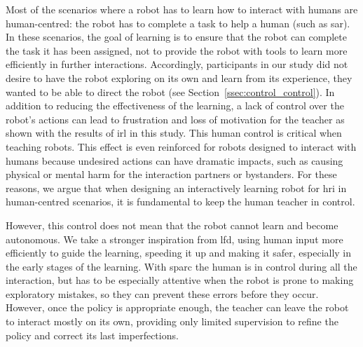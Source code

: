 Most of the scenarios where a robot has to learn how to interact with humans are human-centred: the robot has to complete a task to help a human (such as \gls{sar}). In these scenarios, the goal of learning is to ensure that the robot can complete the task it has been assigned, not to provide the robot with tools to learn more efficiently in further interactions. Accordingly, participants in our study did not desire to have the robot exploring on its own and learn from its experience, they wanted to be able to direct the robot (see Section~\ref{ssec:control_control}). In addition to reducing the effectiveness of the learning, a lack of control over the robot's actions can lead to frustration and loss of motivation for the teacher as shown with the results of \gls{irl} in this study. This human control is critical when teaching robots. This effect is even reinforced for robots designed to interact with humans because undesired actions can have dramatic impacts, such as causing physical or mental harm for the interaction partners or bystanders. For these reasons, we argue that when designing an interactively learning robot for \gls{hri} in human-centred scenarios, it is fundamental to keep the human teacher in control. 

However, this control does not mean that the robot cannot learn and become autonomous. We take a stronger inspiration from \gls{lfd}, using human input more efficiently to guide the learning, speeding it up and making it safer, especially in the early stages of the learning. With \gls{sparc} the human is in control during all  the interaction, but has to be especially attentive when the robot is prone to making exploratory mistakes, so they can prevent these errors before they occur. However, once the policy is appropriate enough, the teacher can leave the robot to interact mostly on its own, providing only limited supervision to refine the policy and correct its last imperfections.


